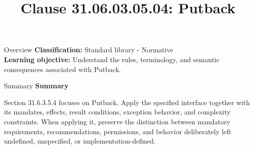 \documentclass[10pt,letterpaper]{article}
\title{Clause 31.06.03.05.04: Putback}
\author{}
\date{}
\begin{document}
\maketitle
\begin{CornellOverviewBox}{Overview}
\textbf{Classification:} Standard library - Normative\\[2pt]
\textbf{Learning objective:} Understand the rules, terminology, and semantic consequences associated with Putback.
\end{CornellOverviewBox}\begin{CornellSummaryBox}{Summary}
{\sffamily\bfseries\color{Accent} Summary}\par\vspace{3pt}Section 31.6.3.5.4 focuses on Putback. Apply the specified interface together with its mandates, effects, result conditions, exception behavior, and complexity constraints. When applying it, preserve the distinction between mandatory requirements, recommendations, permissions, and behavior deliberately left undefined, unspecified, or implementation-defined.
\end{CornellSummaryBox}
\end{document}
